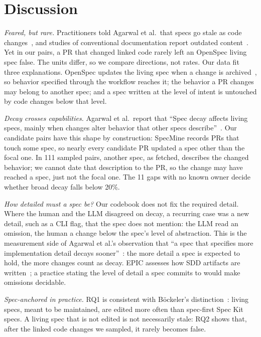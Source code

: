 \documentclass[10pt,conference]{IEEEtran}
\begin{document}
\section{Discussion}
\emph{Feared, but rare.} Practitioners told Agarwal et al.\ that specs go stale as code changes~\cite{agarwal2026sdd}, and studies of conventional documentation report outdated content~\cite{aghajani2019issues,tan2024outdated}. Yet in our pairs, a PR that changed linked code rarely left an OpenSpec living spec false. The units differ, so we compare directions, not rates. Our data fit three explanations. OpenSpec updates the living spec when a change is archived~\cite{openspecdocs}, so behavior specified through the workflow reaches it; the behavior a PR changes may belong to another spec; and a spec written at the level of intent is untouched by code changes below that level.

\emph{Decay crosses capabilities.} Agarwal et al.\ report that ``Spec decay affects living specs, mainly when changes alter behavior that other specs describe''~\cite{agarwal2026sdd}. Our candidate pairs have this shape by construction: SpecMine records PRs that touch some spec, so nearly every candidate PR updated a spec other than the focal one. In 111 sampled pairs, another spec, as fetched, describes the changed behavior; we cannot date that description to the PR, so the change may have reached a spec, just not the focal one. The 11 gaps with no known owner decide whether broad decay falls below 20\%.

\emph{How detailed must a spec be?} Our codebook does not fix the required detail. Where the human and the LLM disagreed on decay, a recurring case was a new detail, such as a CLI flag, that the spec does not mention: the LLM read an omission, the human a change below the spec's level of abstraction. This is the measurement side of Agarwal et al.'s observation that ``a spec that specifies more implementation detail decays sooner''~\cite{agarwal2026sdd}: the more detail a spec is expected to hold, the more changes count as decay. EPIC assesses how SDD artifacts are written~\cite{claudino2026epic}; a practice stating the level of detail a spec commits to would make omissions decidable.

\emph{Spec-anchored in practice.} RQ1 is consistent with B\"ockeler's distinction~\cite{bockeler2025sdd}: living specs, meant to be maintained, are edited more often than spec-first Spec Kit specs. A living spec that is not edited is not necessarily stale: RQ2 shows that, after the linked code changes we sampled, it rarely becomes false.
\end{document}
